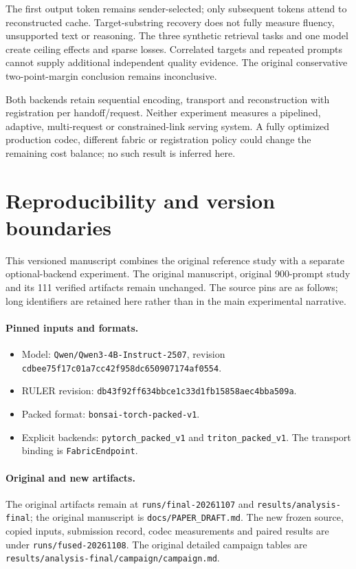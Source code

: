 \documentclass[10pt,twocolumn,letterpaper]{article}
\begin{document}
The first output token remains sender-selected; only subsequent tokens attend
to reconstructed cache. Target-substring recovery does not fully measure
fluency, unsupported text or reasoning. The three synthetic retrieval tasks and
one model create ceiling effects and sparse losses. Correlated targets and
repeated prompts cannot supply additional independent quality evidence. The
original conservative two-point-margin conclusion remains inconclusive.

Both backends retain sequential encoding, transport and reconstruction with
registration per handoff/request. Neither experiment measures a pipelined,
adaptive, multi-request or constrained-link serving system. A fully optimized
production codec, different fabric or registration policy could change the
remaining cost balance; no such result is inferred here.

\FloatBarrier
\appendix
\section{Reproducibility and version boundaries}\label{sec:repro}
This versioned manuscript combines the original reference study with a
separate optional-backend experiment. The original manuscript, original
900-prompt study and its 111 verified artifacts remain unchanged. The source
pins are as follows; long identifiers are retained here rather than in the
main experimental narrative.

\paragraph{Pinned inputs and formats.}
\begin{itemize}\setlength{\itemsep}{2pt}
\item Model: {\small\nolinkurl{Qwen/Qwen3-4B-Instruct-2507}}, revision
{\small\nolinkurl{cdbee75f17c01a7cc42f958dc650907174af0554}}.
\item RULER revision:
{\small\nolinkurl{db43f92ff634bbce1c33d1fb15858aec4bba509a}}.
\item Packed format: {\small\nolinkurl{bonsai-torch-packed-v1}}.
\item Explicit backends: {\small\nolinkurl{pytorch_packed_v1}} and
{\small\nolinkurl{triton_packed_v1}}. The transport binding is
{\small\nolinkurl{FabricEndpoint}}.
\end{itemize}

\paragraph{Original and new artifacts.}
The original artifacts remain at
{\small\nolinkurl{runs/final-20261107}} and
{\small\nolinkurl{results/analysis-final}}; the original manuscript is
{\small\nolinkurl{docs/PAPER_DRAFT.md}}. The new frozen source, copied inputs,
submission record, codec measurements and paired results are under
{\small\nolinkurl{runs/fused-20261108}}. The original detailed campaign tables
are {\small\nolinkurl{results/analysis-final/campaign/campaign.md}}.
\end{document}
